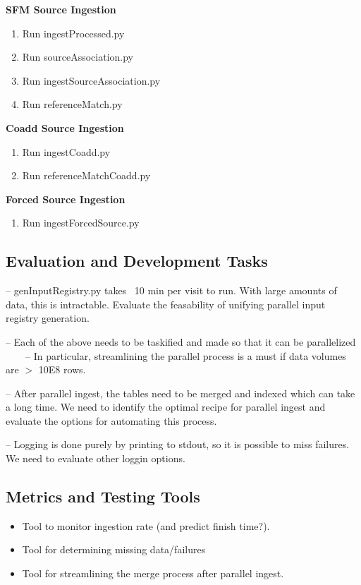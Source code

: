 \documentclass[12pt]{article}
\begin{document}
{\bf SFM Source Ingestion}
\begin{enumerate}
\item Run ingestProcessed.py
\item Run sourceAssociation.py
\item Run ingestSourceAssociation.py
\item Run referenceMatch.py
\end{enumerate}

{\bf Coadd Source Ingestion}
\begin{enumerate}
\item Run ingestCoadd.py
\item Run referenceMatchCoadd.py
\end{enumerate}

{\bf Forced Source Ingestion}
\begin{enumerate}
\item Run ingestForcedSource.py
\end{enumerate}

\subsection{Evaluation and Development Tasks}
-- genInputRegistry.py takes ~10 min per visit to run.  With large amounts of data, this is intractable.  Evaluate the feasability of unifying parallel input registry generation.

-- Each of the above needs to be taskified and made so that it can be parallelized
~~~~-- In particular, streamlining the parallel process is a must if data volumes are $>$ 10E8 rows.

-- After parallel ingest, the tables need to be merged and indexed which can take a long time.  We need to identify the optimal recipe for parallel ingest and evaluate the options for automating this process.

-- Logging is done purely by printing to stdout, so it is possible to miss failures.  We need to evaluate other loggin options.

\subsection{Metrics and Testing Tools}
\begin{itemize}
\item Tool to monitor ingestion rate (and predict finish time?).
\item Tool for determining missing data/failures
\item Tool for streamlining the merge process after parallel ingest.
\end{itemize}
\end{document}
